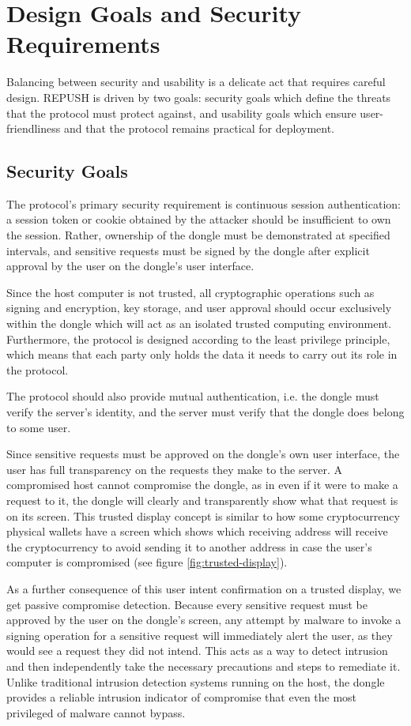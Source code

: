 \section{Design Goals and Security Requirements}
Balancing between security and usability is a delicate act that requires careful design. REPUSH is driven by two goals: security goals which define the threats that the protocol must protect against, and usability goals which ensure user-friendliness and that the protocol remains practical for deployment. 

\subsection{Security Goals}

The protocol's primary security requirement is continuous session authentication: a session token or cookie obtained by the attacker should be insufficient to own the session. Rather, ownership of the dongle must be demonstrated at specified intervals, and sensitive requests must be signed by the dongle after explicit approval by the user on the dongle's user interface. 

Since the host computer is not trusted, all cryptographic operations such as signing and encryption, key storage, and user approval should occur exclusively within the dongle which will act as an isolated trusted computing environment. Furthermore, the protocol is designed according to the least privilege principle, which means that each party only holds the data it needs to carry out its role in the protocol. 

The protocol should also provide mutual authentication, i.e. the dongle must verify the server's identity, and the server must verify that the dongle does belong to some user. 

Since sensitive requests must be approved on the dongle's own user interface, the user has full transparency on the requests they make to the server. A compromised host cannot compromise the dongle, as in even if it were to make a request to it, the dongle will clearly and transparently show what that request is on its screen. This trusted display concept \cite{ledgertrusteddisplay} is similar to how some cryptocurrency physical wallets have a screen which shows which receiving address will receive the cryptocurrency to avoid sending it to another address in case the user's computer is compromised (see figure \ref{fig:trusted-display}). 

As a further consequence of this user intent confirmation on a trusted display, we get passive compromise detection. Because every sensitive request must be approved by the user on the dongle's screen, any attempt by malware to invoke a signing operation for a sensitive request will immediately alert the user, as they would see a request they did not intend. This acts as a way to detect intrusion and then independently take the necessary precautions and steps to remediate it. Unlike traditional intrusion detection systems running on the host, the dongle provides a reliable intrusion indicator of compromise that even the most privileged of malware cannot bypass.

